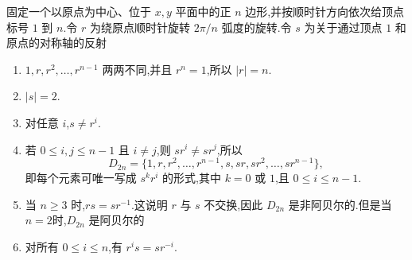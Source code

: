 固定一个以原点为中心、位于 $x,y$ 平面中的正 $n$ 边形,并按顺时针方向依次给顶点标号 $1$ 到 $n$.令 $r$ 为绕原点顺时针旋转 $2\pi/n$ 弧度的旋转.令 $s$ 为关于通过顶点 $1$ 和原点的对称轴的反射
\begin{proposition}
	\begin{enumerate}[label=(\arabic*)]
	\item $1,r,r^2,\ldots,r^{n-1}$ 两两不同,并且 $r^n=1$,所以 $|r|=n$.
	\item $|s|=2$.
	\item 对任意 $i$,$s\neq r^i$.
	\item 若 $0\leq i,j\leq n-1$ 且 $i\neq j$,则 $sr^i\neq sr^j$,所以
	\[
	D_{2n}=\{1,r,r^2,\ldots,r^{n-1},s,sr,sr^2,\ldots,sr^{n-1}\},
	\]
	即每个元素可唯一写成 $s^kr^i$ 的形式,其中 $k=0$ 或 $1$,且 $0\leq i\leq n-1$.
	\item 当 $n\geq 3$ 时,$rs=sr^{-1}$.这说明 $r$ 与 $s$ 不交换,因此 $D_{2n}$ 是非阿贝尔的.但是当$n=2$时,$D_{2n}$ 是阿贝尔的
	\item 对所有 $0\leq i\leq n$,有 $r^is=sr^{-i}$.
\end{enumerate}
\end{proposition}

